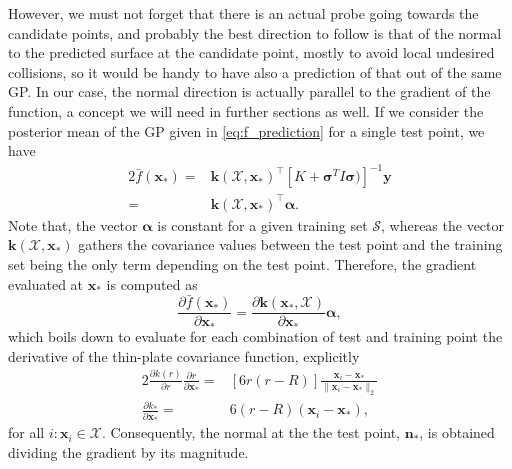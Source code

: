 However, we must not forget that there is an actual probe going towards the candidate points, and probably the best direction to follow is that of the normal to the predicted surface at the candidate point, mostly to avoid local undesired collisions, so it would be handy to have also a prediction of that out of the same GP. In our case, the normal direction is actually parallel to the gradient of the function, a concept we will need in further sections as well. If we consider the posterior mean of the GP given in \ref{eq:f_prediction} for a single test point, we have
\begin{alignat}{2}
\bar{f}(\mathbf{x}_*) = & \mathbf{k}(\mathcal{X},\mathbf{x}_*)^\top [K + \boldsymbol{\sigma}^{T} I \boldsymbol{\sigma})]^{-1}\mathbf{y} \nonumber \\ = & \mathbf{k}(\mathcal{X},\mathbf{x}_*)^\top \boldsymbol{\alpha}.
\end{alignat}
Note that, the vector $\boldsymbol{\alpha}$ is constant for a given training set $\mathcal{S}$, whereas the vector $\mathbf{k}(\mathcal{X},\mathbf{x}_*)$ gathers the covariance values between the test point and the training set being the only term depending on the test point. Therefore, the  gradient evaluated at $\mathbf{x}_*$ is computed as
\begin{equation}
 \frac{\partial \bar{f}(\mathbf{x}_*)}{\partial \mathbf{x}_*} = \frac{\partial \mathbf{k}(\mathbf{x}_*,\mathcal{X})}{\partial \mathbf{x}_*} \boldsymbol{\alpha},
\end{equation}
which boils down to evaluate for each combination of test and training point the derivative of the thin-plate covariance function, explicitly
\begin{alignat}{2}
  \frac{\partial k(r)}{ \partial r} \frac{\partial r}{ \partial \mathbf{x}_*} = & [6r (r - R)] \frac{\mathbf{x}_i - \mathbf{x}_*}{\| \mathbf{x}_i - \mathbf{x}_* \|_2} \nonumber \\ \frac{\partial k_*}{ \partial \mathbf{x}_*} = & 6(r - R) (\mathbf{x}_i - \mathbf{x}_*),
\end{alignat}
for all $i : \mathbf{x}_i \in \mathcal{X}$. Consequently, the normal at the the test point, $\mathbf{n}_*$, is obtained dividing the gradient by its magnitude.




